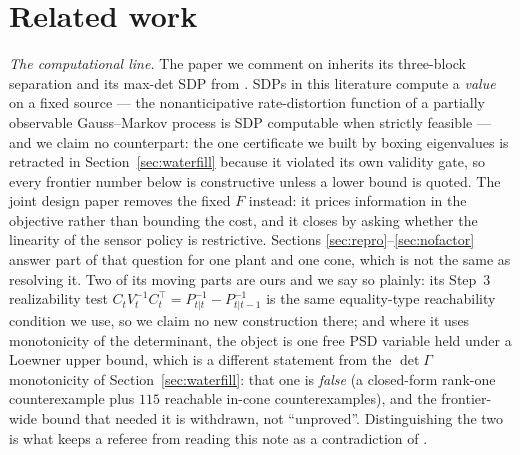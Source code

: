\documentclass[journal]{IEEEtran}
\theoremstyle{remark}
\begin{document}
\section{Related work}
\label{sec:related}

\emph{The computational line.} The paper we comment on \cite{refpaper} inherits
its three-block separation and its max-det SDP from \cite{tanaka2018di}. SDPs in
this literature compute a \emph{value} on a fixed source --- the nonanticipative
rate-distortion function of a partially observable Gauss--Markov process is SDP
computable when strictly feasible \cite{stavrou2019indirect} --- and we claim no
counterpart: the one certificate we built by boxing eigenvalues is retracted in
Section~\ref{sec:waterfill} because it violated its own validity gate, so every
frontier number below is constructive unless a lower bound is quoted. The joint
design paper \cite{tanaka2015joint} removes the fixed $F$ instead: it prices
information in the objective rather than bounding the cost, and it closes by
asking whether the linearity of the sensor policy is restrictive. Sections
\ref{sec:repro}--\ref{sec:nofactor} answer part of that question for one plant and
one cone, which is not the same as resolving it. Two of its moving parts are ours
and we say so plainly: its Step~3 realizability test
$C_tV_t^{-1}C_t^{\top}=P_{t|t}^{-1}-P_{t|t-1}^{-1}$ is the same equality-type
reachability condition we use, so we claim no new construction there; and where it
uses monotonicity of the determinant, the object is one free PSD variable held
under a Loewner upper bound, which is a different statement from the
$\det\Gamma$ monotonicity of Section~\ref{sec:waterfill}: that one is
\emph{false} (a closed-form rank-one counterexample plus $115$ reachable in-cone
counterexamples), and the frontier-wide bound that needed it is withdrawn, not
``unproved''. Distinguishing the two is what keeps a referee from reading this
note as a contradiction of \cite{tanaka2018di}.
\end{document}
